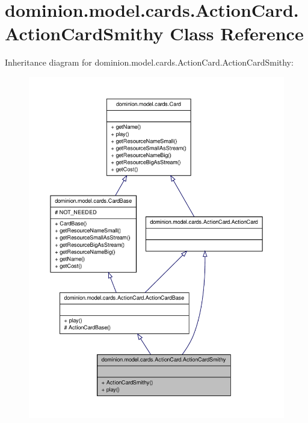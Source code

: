 \hypertarget{classdominion_1_1model_1_1cards_1_1ActionCard_1_1ActionCardSmithy}{\section{dominion.\-model.\-cards.\-Action\-Card.\-Action\-Card\-Smithy \-Class \-Reference}
\label{classdominion_1_1model_1_1cards_1_1ActionCard_1_1ActionCardSmithy}
}


\-Inheritance diagram for dominion.\-model.\-cards.\-Action\-Card.\-Action\-Card\-Smithy\-:
\nopagebreak
\begin{figure}[H]
\begin{center}
\leavevmode
\includegraphics[width=350pt]{classdominion_1_1model_1_1cards_1_1ActionCard_1_1ActionCardSmithy__inherit__graph}
\end{center}
\end{figure}


